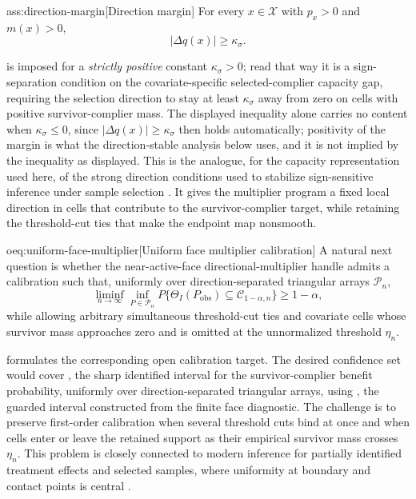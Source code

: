 \begin{assumptionv}{ass:direction-margin}[Direction margin]
For every \(x\in\mathcal X\) with \(p_x>0\) and \(m(x)>0\),
\[
|\Delta q(x)|\ge \kappa_{\sigma}.
\]
\end{assumptionv}

 is imposed for a \emph{strictly positive} constant \(\kappa_{\sigma}>0\); read that way it is a sign-separation condition on the covariate-specific selected-complier capacity gap, requiring the selection direction to stay at least \(\kappa_{\sigma}\) away from zero on cells with positive survivor-complier mass.  The displayed inequality alone carries no content when \(\kappa_{\sigma}\le 0\), since \(|\Delta q(x)|\ge\kappa_{\sigma}\) then holds automatically; positivity of the margin is what the direction-stable analysis below uses, and it is not implied by the inequality as displayed.  This is the analogue, for the capacity representation used here, of the strong direction conditions used to stabilize sign-sensitive inference under sample selection \citep{Semenova2025}.  It gives the multiplier program a fixed local direction in cells that contribute to the survivor-complier target, while retaining the threshold-cut ties that make the endpoint map nonsmooth.

\begin{remarkv}{oeq:uniform-face-multiplier}[Uniform face multiplier calibration]
A natural next question is whether the near-active-face directional-multiplier handle admits a calibration such that, uniformly over direction-separated triangular arrays \(\mathcal P_n\),
\[
\liminf_{n\to\infty}\inf_{P\in\mathcal P_n}
P\{\Theta_I(P_{\mathrm{obs}})\subseteq\mathcal C_{1-\alpha,n}\}
\ge 1-\alpha,
\]
while allowing arbitrary simultaneous threshold-cut ties and covariate cells whose survivor mass approaches zero and is omitted at the unnormalized threshold \(\eta_n\).
\end{remarkv}

 formulates the corresponding open calibration target.  The desired confidence set would cover , the sharp identified interval for the survivor-complier benefit probability, uniformly over direction-separated triangular arrays, using , the guarded interval constructed from the finite face diagnostic.  The challenge is to preserve first-order calibration when several threshold cuts bind at once and when cells enter or leave the retained support as their empirical survivor mass crosses \(\eta_n\).  This problem is closely connected to modern inference for partially identified treatment effects and selected samples, where uniformity at boundary and contact points is central \citep{LeeLiu2024,BartalottiKedagniPossebom2023}.

